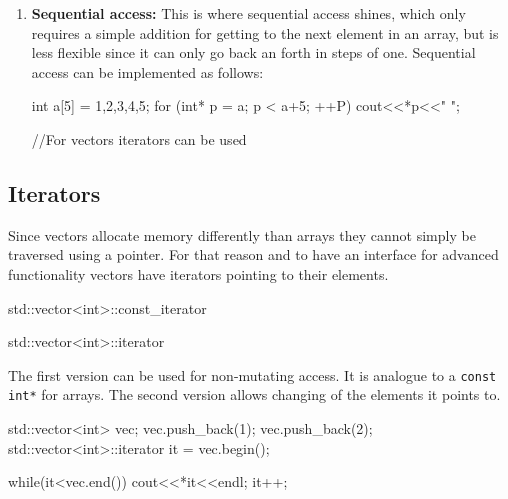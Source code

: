 \documentclass[10pt,a4paper]{scrartcl}
\begin{document}
\begin{multicols*}{2}
\begin{enumerate}
\begin{TPCpp}
//long array (syntax simplified!)
int a [] = {1,2,3,4,5,6,...,100};

//random access:
a[33]; // identical to: *(a+33);
\end{TPCpp}

The random access operation as described above requires a single addition and an implicit multiplication automatically made through pointer arithmetic when adding a number to a pointer.

This access method is really flexible but also costly.
\item \textbf{Sequential access:} This is where sequential access shines, which only requires a simple addition for getting to the next element in an array, but is less flexible since it can only go back an forth in steps of one. Sequential access can be implemented as follows:

\begin{TPCpp}
int a[5] = {1,2,3,4,5};
for (int* p = a; p < a+5; ++P)
	cout<<*p<<" ";
	
//For vectors iterators can be used

\end{TPCpp}
\end{enumerate}

\subsection{Iterators}

Since vectors allocate memory differently than arrays they cannot simply be traversed using a pointer. For that reason and to have an interface for advanced functionality vectors have iterators pointing to their elements.

\begin{TPCpp}
std::vector<int>::const_iterator

std::vector<int>::iterator
\end{TPCpp}

The first version can be used for non-mutating access. It is analogue to a \verb+const int*+ for arrays. The second version allows changing of the elements it points to. 

\begin{TPCpp}
std::vector<int> vec;
vec.push_back(1);
vec.push_back(2);
std::vector<int>::iterator it = vec.begin();

while(it<vec.end()) {
	cout<<*it<<endl;
	it++;
}
\end{TPCpp}


\end{multicols*}
\end{document}
